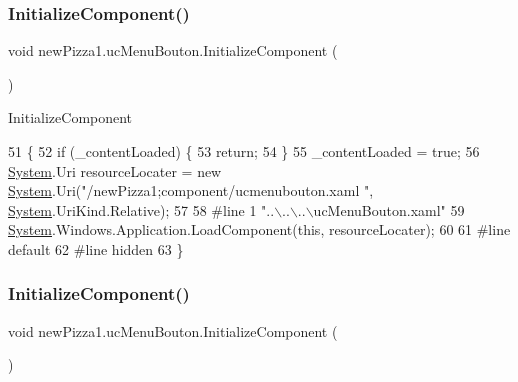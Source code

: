 \subsubsection{\texorpdfstring{Initialize\+Component()}{InitializeComponent()}\hspace{0.1cm}{\footnotesize\ttfamily [2/6]}}
{\footnotesize\ttfamily void new\+Pizza1.\+uc\+Menu\+Bouton.\+Initialize\+Component (\begin{DoxyParamCaption}{ }\end{DoxyParamCaption})\hspace{0.3cm}{\ttfamily [inline]}}



Initialize\+Component 


\begin{DoxyCode}
51                                           \{
52             \textcolor{keywordflow}{if} (\_contentLoaded) \{
53                 \textcolor{keywordflow}{return};
54             \}
55             \_contentLoaded = \textcolor{keyword}{true};
56             \hyperlink{namespaceSystem}{System}.Uri resourceLocater = \textcolor{keyword}{new} \hyperlink{namespaceSystem}{System}.Uri(\textcolor{stringliteral}{"/newPizza1;component/ucmenubouton.xaml
      "}, \hyperlink{namespaceSystem}{System}.UriKind.Relative);
57             
58 \textcolor{preprocessor}{            #line 1 "..\(\backslash\)..\(\backslash\)..\(\backslash\)ucMenuBouton.xaml"}
59             \hyperlink{namespaceSystem}{System}.Windows.Application.LoadComponent(\textcolor{keyword}{this}, resourceLocater);
60             
61 \textcolor{preprocessor}{            #line default}
62 \textcolor{preprocessor}{            #line hidden}
63         \}
\end{DoxyCode}
\mbox{\label{classnewPizza1_1_1ucMenuBouton_a080790946e454afc7d1441447a1e2313}} 
\subsubsection{\texorpdfstring{Initialize\+Component()}{InitializeComponent()}\hspace{0.1cm}{\footnotesize\ttfamily [3/6]}}
{\footnotesize\ttfamily void new\+Pizza1.\+uc\+Menu\+Bouton.\+Initialize\+Component (\begin{DoxyParamCaption}{ }\end{DoxyParamCaption})\hspace{0.3cm}{\ttfamily [inline]}}



